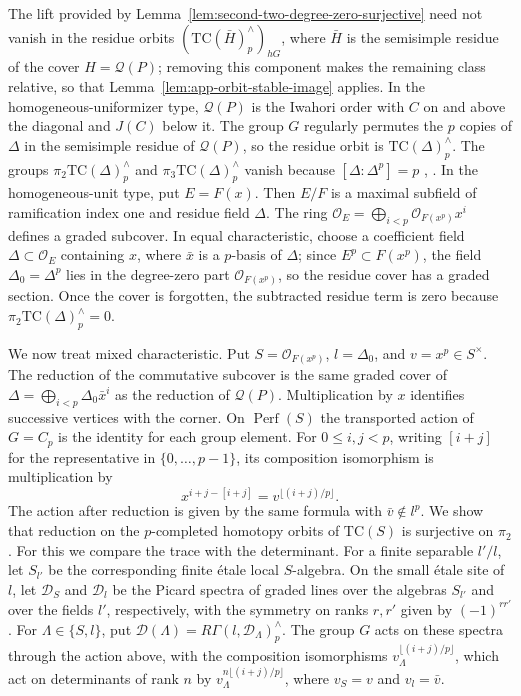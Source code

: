 The lift provided by Lemma~\ref{lem:second-two-degree-zero-surjective} need not vanish in the residue orbits $(\mathrm{TC}(\bar H)^\wedge_p)_{hG}$, where $\bar H$ is the semisimple residue of the cover $H=\mathcal Q(P)$; removing this component makes the remaining class relative, so that Lemma~\ref{lem:app-orbit-stable-image} applies.
In the homogeneous-uniformizer type, $\mathcal Q(P)$ is the Iwahori order with $C$ on and above the diagonal and $J(C)$ below it.
The group $G$ regularly permutes the $p$ copies of $\Delta$ in the semisimple residue of $\mathcal Q(P)$, so the residue orbit is $\mathrm{TC}(\Delta)^\wedge_p$.
The groups $\pi_2\mathrm{TC}(\Delta)^\wedge_p$ and $\pi_3\mathrm{TC}(\Delta)^\wedge_p$ vanish because $[\Delta:\Delta^p]=p$ \cite[Theorem 6.5]{ClausenMathewMorrow}, \cite[Theorem 8.1]{GeisserLevine}.
In the homogeneous-unit type, put $E=F(x)$.
Then $E/F$ is a maximal subfield of ramification index one and residue field $\Delta$.
The ring $\mathcal O_E=\bigoplus_{i<p}\mathcal O_{F(x^p)} x^i$ defines a graded subcover.
In equal characteristic, choose a coefficient field $\Delta\subset\mathcal O_E$ containing $x$, where $\bar x$ is a $p$-basis of $\Delta$; since $E^p\subset F(x^p)$, the field $\Delta_0=\Delta^p$ lies in the degree-zero part $\mathcal O_{F(x^p)}$, so the residue cover has a graded section.
Once the cover is forgotten, the subtracted residue term is zero because $\pi_2\mathrm{TC}(\Delta)^\wedge_p=0$.

We now treat mixed characteristic.
Put $S=\mathcal O_{F(x^p)}$, $l=\Delta_0$, and $v=x^p\in S^\times$.
The reduction of the commutative subcover is the same graded cover of $\Delta=\bigoplus_{i<p}\Delta_0\bar x^i$ as the reduction of $\mathcal Q(P)$.
Multiplication by $x$ identifies successive vertices with the corner.
On $\operatorname{Perf}(S)$ the transported action of $G=C_p$ is the identity for each group element.
For $0\le i,j<p$, writing $[i+j]$ for the representative in $\{0,\ldots,p-1\}$, its composition isomorphism is multiplication by
\[
 x^{i+j-[i+j]}=v^{\lfloor(i+j)/p\rfloor}.
\]
The action after reduction is given by the same formula with $\bar v\notin l^p$.
We show that reduction on the $p$-completed homotopy orbits of $\mathrm{TC}(S)$ is surjective on $\pi_2$.
For this we compare the trace with the determinant.
For a finite separable $l'/l$, let $S_{l'}$ be the corresponding finite \'etale local $S$-algebra.
On the small \'etale site of $l$, let $\mathcal D_S$ and $\mathcal D_l$ be the Picard spectra of graded lines over the algebras $S_{l'}$ and over the fields $l'$, respectively, with the symmetry on ranks $r,r'$ given by $(-1)^{rr'}$.
For $\Lambda\in\{S,l\}$, put $\mathcal D(\Lambda)=R\Gamma(l,\mathcal D_\Lambda)^\wedge_p$.
The group $G$ acts on these spectra through the action above, with the composition isomorphisms $v_\Lambda^{\lfloor(i+j)/p\rfloor}$, which act on determinants of rank $n$ by $v_\Lambda^{n\lfloor(i+j)/p\rfloor}$, where $v_S=v$ and $v_l=\bar v$.

